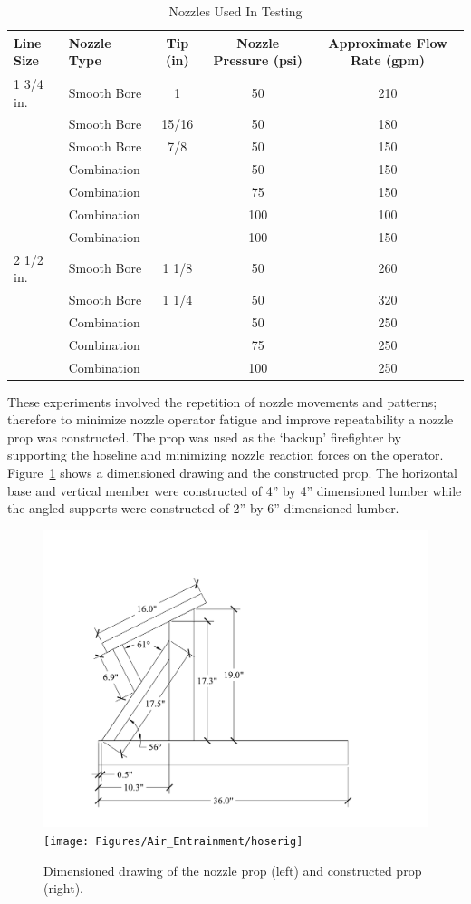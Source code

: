 \documentclass[12pt,oneside]{book}
\begin{document}
\begin{table}[!ht]
\centering
\caption{Nozzles Used In Testing}\label{tab:Nozzle Selection}
\begin{tabular}{llccc}
\toprule[1.5pt]
Line Size & Nozzle Type & Tip (in)& Nozzle Pressure (psi) & Approximate Flow Rate (gpm) \\
\midrule
1 3/4 in. & Smooth Bore & 1     & 50  & 210 \\
          & Smooth Bore & 15/16 & 50  & 180 \\
          & Smooth Bore & 7/8   & 50  & 150 \\
          & Combination &       & 50  & 150 \\
          & Combination &       & 75  & 150 \\
          & Combination &       & 100 & 100 \\
          & Combination &       & 100 & 150 \\
\midrule
2 1/2 in. & Smooth Bore & 1 1/8 & 50  & 260 \\
          & Smooth Bore & 1 1/4 & 50  & 320 \\
          & Combination &       & 50  & 250 \\ 
          & Combination &       & 75  & 250 \\
          & Combination &       & 100 & 250 \\
\bottomrule[1.25pt]
\end{tabular}
\end{table}

These experiments involved the repetition of nozzle movements and patterns; therefore to minimize nozzle operator fatigue and improve repeatability a nozzle prop was constructed. The prop was used as the `backup' firefighter by supporting the hoseline and minimizing nozzle reaction forces on the operator. Figure~\ref{fig:Nozzle_Prop} shows a dimensioned drawing and the constructed prop. The horizontal base and vertical member were constructed of 4'' by 4'' dimensioned lumber while the angled supports were constructed of 2'' by 6'' dimensioned lumber.

\begin{figure}[!ht]
\centering
    \includegraphics[width=.45\columnwidth]{Figures/Water_Distribution/GIBside}
	\texttt{[image: Figures/Air\_Entrainment/hoserig]}
	\caption[Nozzle Prop]{Dimensioned drawing of the nozzle prop (left) and constructed prop (right).}
	\label{fig:Nozzle_Prop}
\end{figure}
\end{document}
